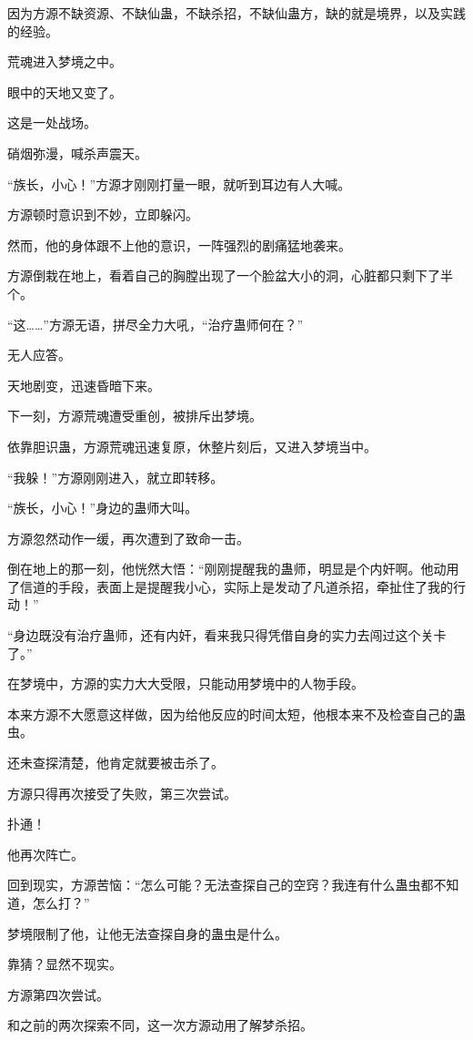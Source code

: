 \begin{this_body}
因为方源不缺资源、不缺仙蛊，不缺杀招，不缺仙蛊方，缺的就是境界，以及实践的经验。

荒魂进入梦境之中。

眼中的天地又变了。

这是一处战场。

硝烟弥漫，喊杀声震天。

“族长，小心！”方源才刚刚打量一眼，就听到耳边有人大喊。

方源顿时意识到不妙，立即躲闪。

然而，他的身体跟不上他的意识，一阵强烈的剧痛猛地袭来。

方源倒栽在地上，看着自己的胸膛出现了一个脸盆大小的洞，心脏都只剩下了半个。

“这……”方源无语，拼尽全力大吼，“治疗蛊师何在？”

无人应答。

天地剧变，迅速昏暗下来。

下一刻，方源荒魂遭受重创，被排斥出梦境。

依靠胆识蛊，方源荒魂迅速复原，休整片刻后，又进入梦境当中。

“我躲！”方源刚刚进入，就立即转移。

“族长，小心！”身边的蛊师大叫。

方源忽然动作一缓，再次遭到了致命一击。

倒在地上的那一刻，他恍然大悟：“刚刚提醒我的蛊师，明显是个内奸啊。他动用了信道的手段，表面上是提醒我小心，实际上是发动了凡道杀招，牵扯住了我的行动！”

“身边既没有治疗蛊师，还有内奸，看来我只得凭借自身的实力去闯过这个关卡了。”

在梦境中，方源的实力大大受限，只能动用梦境中的人物手段。

本来方源不大愿意这样做，因为给他反应的时间太短，他根本来不及检查自己的蛊虫。

还未查探清楚，他肯定就要被击杀了。

方源只得再次接受了失败，第三次尝试。

扑通！

他再次阵亡。

回到现实，方源苦恼：“怎么可能？无法查探自己的空窍？我连有什么蛊虫都不知道，怎么打？”

梦境限制了他，让他无法查探自身的蛊虫是什么。

靠猜？显然不现实。

方源第四次尝试。

和之前的两次探索不同，这一次方源动用了解梦杀招。


\end{this_body}
